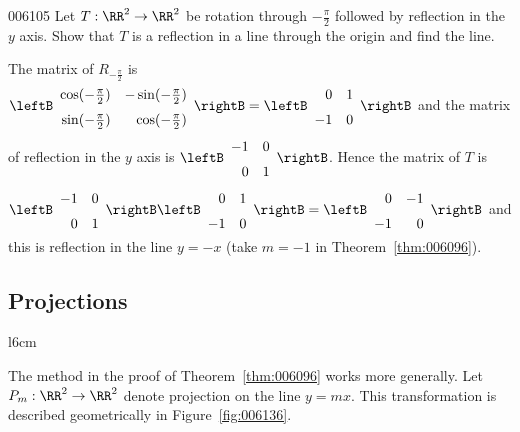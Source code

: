 \begin{example}{}{006105}
Let $T : \RR^2 \to \RR^2$ be rotation through $-\frac{\pi}{2}$ followed by reflection in the $y$ axis. Show that $T$ is a reflection in a line through the origin and find the line.

\begin{solution}
  The matrix of $R_{-\frac{\pi}{2}}$
 is $\leftB \def\arraystretch{1.5} \begin{array}{rr}
 \cos(-\frac{\pi}{2}) & -\sin(-\frac{\pi}{2}) \\
 \sin(-\frac{\pi}{2}) & \cos(-\frac{\pi}{2})
 \end{array} \rightB = \leftB \begin{array}{rr}
 0 & 1 \\
 -1 & 0
 \end{array} \rightB$
 and the matrix of reflection in the $y$ axis is $\leftB \begin{array}{rr}
 -1 & 0 \\
 0 & 1
 \end{array} \rightB$.
 Hence the matrix of $T$ is $\leftB \begin{array}{rr}
 -1 & 0 \\
 0 & 1
 \end{array} \rightB \leftB \begin{array}{rr}
 0 & 1 \\
 -1 & 0
 \end{array} \rightB = \leftB \begin{array}{rr}
 0 & -1 \\
 -1 & 0
 \end{array} \rightB$
 and this is reflection in the line $y = -x$ (take $m = -1$ in Theorem~\ref{thm:006096}).
\end{solution}
\end{example}

\subsection*{Projections}
\begin{wrapfigure}{l}{6cm} 
\centering

\caption{\label{fig:006136}}
\end{wrapfigure}

The method in the proof of Theorem~\ref{thm:006096} works more generally. Let $P_{m} : \RR^2 \to \RR^2$ denote projection on the line $y = mx$. This transformation is described geometrically in Figure~\ref{fig:006136}. 

